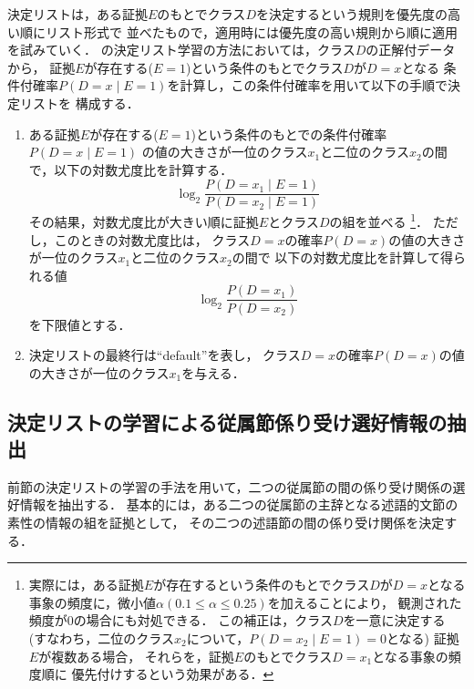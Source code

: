 決定リストは，ある証拠$E$のもとでクラス$D$を決定するという規則を優先度の高い順にリスト形式で
並べたもので，適用時には優先度の高い規則から順に適用を試みていく．
\cite{Yarowsky94a}の決定リスト学習の方法においては，クラス$D$の正解付データから，
証拠$E$が存在する($E\!=\!1$)という条件のもとでクラス$D$が$D\!=\!x$となる
条件付確率$P(D\!=\!x\mid E\!=\!1)$を計算し，この条件付確率を用いて以下の手順で決定リストを
構成する．
\begin{enumerate}
  \item ある証拠$E$が存在する($E\!=\!1$)という条件のもとでの条件付確率$P(D\!=\!x\mid E\!=\!1)$
        \mbox{の値の大きさが一位のクラス}$x_1$と二位のクラス$x_2$の間で，以下の対数尤度比を計算する．
        \[
        \log_2 \frac{P(D\!=\!x_1\mid E\!=\!1)}{P(D\!=\!x_2\mid E\!=\!1)}
        \]
        その結果，対数尤度比が大きい順に証拠$E$とクラス$D$の組を並べる
        \footnote{
           実際には，ある証拠$E$が存在するという条件のもとでクラス$D$が$D\!=\!x$となる
           事象の頻度に，微小値$\alpha(0.1\leq\alpha\leq 0.25)$を加えることにより，
           観測された頻度が0の場合にも対処できる\cite{Yarowsky94a}．
           この補正は，クラス$D$を一意に\mbox{決定する}
           (すなわち，二位のクラス$x_2$について，$P(D\!=\!x_2\mid E\!=\!1)\!=\!0$となる)
           証拠$E$が複数ある場合，
           \mbox{それらを，証}拠$E$のもとでクラス$D\!=\!x_1$となる事象の頻度順に
           優先付けするという効果がある．
        }．
        ただし，このときの対数尤度比は，
        クラス$D\!=\!x$の確率$P(D\!=\!x)$の値の大きさが一位のクラス$x_1$と二位のクラス$x_2$の間で
        以下の対数尤度比を計算して得られる値
        \[
        \log_2 \frac{P(D\!=\!x_1)}{P(D\!=\!x_2)}
        \]
        を下限値とする．
  \item 決定リストの最終行は``default''を表し，
        クラス$D\!=\!x$の確率$P(D\!=\!x)$の値の大きさが一位のクラス$x_1$を与える．
\end{enumerate}


\subsection{決定リストの学習による従属節係り受け選好情報の抽出}
\label{subsec:dlist_sb}

前節の決定リストの学習の手法を用いて，二つの従属節の間の係り受け関係の選好情報を抽出する．
基本的には，ある二つの従属節の主辞となる述語的文節の素性の情報の組を証拠として，
その二つの述語節の間の係り受け関係を決定する．

